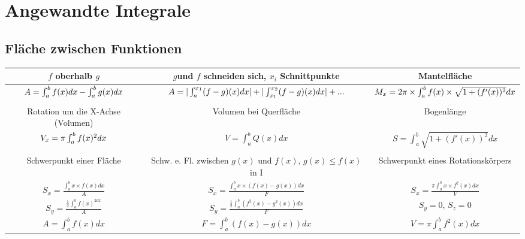 
\section*{Angewandte Integrale}


\subsection*{Fläche zwischen Funktionen}

\begin{tabular}{|c|c|c|}
\hline 
$f$ oberhalb $g$ & $g$und $f$ schneiden sich, $x_{i}$ Schnittpunkte & Mantelfläche\tabularnewline
\hline 
$A=\intop_{a}^{b}f(x)dx-\int_{a}^{b}g(x)dx$ & $A=|\int_{a}^{x_{1}}(f-g)(x)dx|+|\intop_{x_{1}}^{x_{2}}(f-g)(x)dx|+...$ & $M_{x}=2\pi\times\intop_{a}^{b}f(x)\times\sqrt{1+(f'(x))^{2}}dx$\tabularnewline
\hline 
\multicolumn{1}{c}{} & \multicolumn{1}{c}{} & \multicolumn{1}{c}{}\tabularnewline
\hline 
Rotation um die X-Achse (Volumen) & Volumen bei Querfläche & Bogenlänge\tabularnewline
\hline 
$V_{x}=\pi\intop_{a}^{b}f(x)^{2}dx$ & $V=\int_{a}^{b}Q(x)dx$ & $S=\int_{a}^{b}\sqrt{1+(f'(x))^{2}}dx$\tabularnewline
\hline 
\multicolumn{1}{c}{} & \multicolumn{1}{c}{} & \multicolumn{1}{c}{}\tabularnewline
\hline 
Schwerpunkt einer Fläche & Schw. e. Fl. zwischen $g(x)$ und $f(x)$, $g(x)\leq f(x)$ in I & Schwerpunkt eines Rotationskörpers\tabularnewline
\hline 
$S_{x}=\frac{\int_{a}^{b}x\times f(x)dx}{A}$ & $S_{x}=\frac{\int_{a}^{b}x\times(f(x)-g(x))dx}{F}$ & $S_{x}=\frac{\pi\int_{a}^{b}x\times f^{2}(x)dx}{V}$\tabularnewline
\hline 
$S_{y}=\frac{\frac{1}{2}\int_{a}^{b}f(x)^{2dx}}{A}$ & $S_{y}=\frac{\frac{1}{2}\int_{a}^{b}(f^{2}(x)-g^{2}(x))dx}{F}$ & $S_{y}=0$, $S_{z}=0$\tabularnewline
\hline 
$A=\int_{a}^{b}f(x)dx$ & $F=\int_{a}^{b}(f(x)-g(x))dx$ & $V=\pi\int_{a}^{b}f^{2}(x)dx$\tabularnewline
\hline 
\end{tabular}


